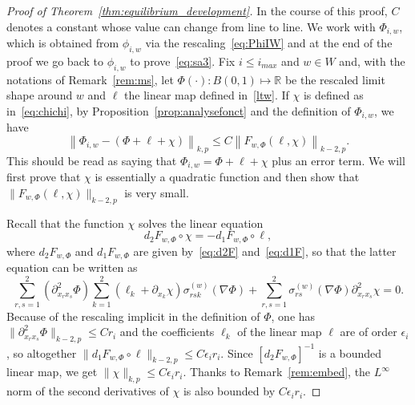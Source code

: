 \documentclass[10pt]{amsart}
\theoremstyle{definition}\newtheorem{defi}[theo]{Definition}\newtheorem{rema}[theo]{Remark}\newtheorem{exam}[theo]{Example}\newtheorem{exem}[theo]{Example}\newtheorem{nota}[theo]{Notation}
\newcommand{\R}{\mathbb{R}}
\newcommand{\norm}[1]{\lVert #1 \rVert}
\newcommand{\eps}{\epsilon}
\begin{document}
\begin{proof}[Proof of Theorem~\ref{thm:equilibrium_development}]
In the course of this proof, $C$ denotes a constant whose value can change from line to line. We work with $\Phi_{i,w}$, which is obtained from $\phi_{i,w}$ via the rescaling~\eqref{eq:PhiIW} and at the end of the proof we go back to $\phi_{i,w}$ to prove~\eqref{eq:sa3}. Fix $i\le i_{max}$ and $w\in W$ and, with the notations of Remark~\ref{rem:ms}, let $\Phi(\cdot):B(0,1)\mapsto
\R$ be the rescaled limit shape around $w$ and $\ell$ the linear map defined in~\eqref{ltw}. If $\chi$ is defined as in~\eqref{eq:chichi}, by Proposition~\ref{prop:analysefonct} and the definition of $\Phi_{i,w}$, we have
\begin{equation}\label{cucina}
\left\|\Phi_{i,w} -(\Phi + \ell + \chi)\right\|_{{k, p}} \leq C \left\|F_{w,\Phi}(\ell, \chi)\right\|_{{k-2, p}}.
\end{equation}
This should be read as saying that $\Phi_{i,w}=\Phi+\ell+\chi$ plus an error term. We will first prove that $\chi$ is essentially a quadratic function and then show that $\norm{F_{w,\Phi}(\ell, \chi)}_{k-2, p}$ is very small.

Recall that the function $\chi$ solves the linear equation
\begin{equation}
d_2 F_{w, \Phi}\circ \chi = - d_1 F_{w, \Phi}\circ \ell,
\end{equation}
where $d_2F_{w,\Phi}$ and $d_1F_{w,\Phi}$ are given by~\eqref{eq:d2F} and~\eqref{eq:d1F}, so that the latter equation can be written as
\begin{equation}\label{eq:chi}
\sum_{r,s=1}^2\left(\partial^2_{x_r x_s}\Phi\right)\sum_{k=1}^2(\ell_k+\partial_{x_k}\chi)\sigma^{(w)}_{rsk}(\nabla\Phi)+\sum_{r,s=1}^2\sigma^{(w)}_{rs}(\nabla\Phi)\partial^2_{x_r x_s}\chi=0.
\end{equation}
Because of the rescaling implicit in the definition of $\Phi$, one has $\norm{\partial^2_{x_r x_s} \Phi}_{{k-2, p}} \leq C r_i$ and the coefficients $\ell_k$ of the linear map $\ell $ are of order $\eps_i$, so altogether $\norm{d_1 F_{w,\Phi}
\circ \ell}_{{k-2, p}} \leq C \eps_i r_i$. Since $[d_2 F_{w,\Phi}]^{-1}$ is a bounded linear map, we get $\norm{\chi}_{{k, p}} \leq C \eps_i r_i$. Thanks to
Remark~\ref{rem:embed}, the $L^\infty$ norm of the second derivatives of $\chi$ is also bounded by $C \eps_i r_i$.


\end{proof}
\end{document}
